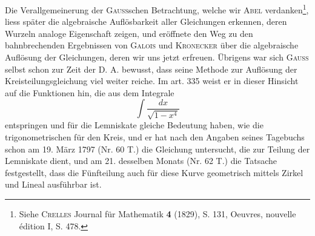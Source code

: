 Die Verallgemeinerung der \textsc{Gauss}schen Betrachtung, welche wir \textsc{Abel} verdanken\footnote{Siehe \textsc{Crelles} Journal für Mathematik \textbf{4} (1829), S. 131, Oeuvres, nouvelle édition I, S. 478.}, liess später die algebraische Auflösbarkeit aller Gleichungen erkennen, deren Wurzeln analoge Eigenschaft zeigen, und eröffnete den Weg zu den bahnbrechenden Ergebnissen von \textsc{Galois} und \textsc{Kronecker} über die algebraische Auflösung der Gleichungen, deren wir uns jetzt erfreuen. Übrigens war sich \textsc{Gauss} selbst schon zur Zeit der D. A. bewusst, dass seine Methode zur Auflösung der Kreisteilungsgleichung viel weiter reiche. Im art. 335 weist er in dieser Hinsicht auf die Funktionen hin, die aus dem Integrale
\[
\int\frac{dx}{\sqrt{1-x^4}}
\]
entspringen und für die Lemniskate gleiche Bedeutung haben, wie die trigonometrischen für den Kreis, und er hat nach den Angaben seines Tagebuchs schon am 19. März 1797 (Nr. 60 T.) die Gleichung untersucht, die zur Teilung der Lemniskate dient, und am 21. desselben Monats (Nr. 62 T.) die Tatsache festgestellt, dass die Fünfteilung auch für diese Kurve geometrisch mittels Zirkel und Lineal ausführbar ist.
